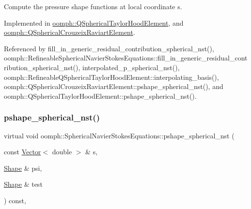 Compute the pressure shape functions at local coordinate s. 



Implemented in \hyperlink{classoomph_1_1QSphericalTaylorHoodElement_acc55b6f8430df47195e31d8e8e6b68c0}{oomph\+::\+Q\+Spherical\+Taylor\+Hood\+Element}, and \hyperlink{classoomph_1_1QSphericalCrouzeixRaviartElement_ae5be79781d11702c84d9493646153e36}{oomph\+::\+Q\+Spherical\+Crouzeix\+Raviart\+Element}.



Referenced by fill\+\_\+in\+\_\+generic\+\_\+residual\+\_\+contribution\+\_\+spherical\+\_\+nst(), oomph\+::\+Refineable\+Spherical\+Navier\+Stokes\+Equations\+::fill\+\_\+in\+\_\+generic\+\_\+residual\+\_\+contribution\+\_\+spherical\+\_\+nst(), interpolated\+\_\+p\+\_\+spherical\+\_\+nst(), oomph\+::\+Refineable\+Q\+Spherical\+Taylor\+Hood\+Element\+::interpolating\+\_\+basis(), oomph\+::\+Q\+Spherical\+Crouzeix\+Raviart\+Element\+::pshape\+\_\+spherical\+\_\+nst(), and oomph\+::\+Q\+Spherical\+Taylor\+Hood\+Element\+::pshape\+\_\+spherical\+\_\+nst().

\mbox{\label{classoomph_1_1SphericalNavierStokesEquations_a862f1da9ef70c289f4220391443b7d09}} 
\subsubsection{\texorpdfstring{pshape\+\_\+spherical\+\_\+nst()}{pshape\_spherical\_nst()}\hspace{0.1cm}{\footnotesize\ttfamily [2/2]}}
{\footnotesize\ttfamily virtual void oomph\+::\+Spherical\+Navier\+Stokes\+Equations\+::pshape\+\_\+spherical\+\_\+nst (\begin{DoxyParamCaption}\item[{const \hyperlink{classoomph_1_1Vector}{Vector}$<$ double $>$ \&}]{s,  }\item[{\hyperlink{classoomph_1_1Shape}{Shape} \&}]{psi,  }\item[{\hyperlink{classoomph_1_1Shape}{Shape} \&}]{test }\end{DoxyParamCaption}) const\hspace{0.3cm}{\ttfamily [protected]}, {}}



